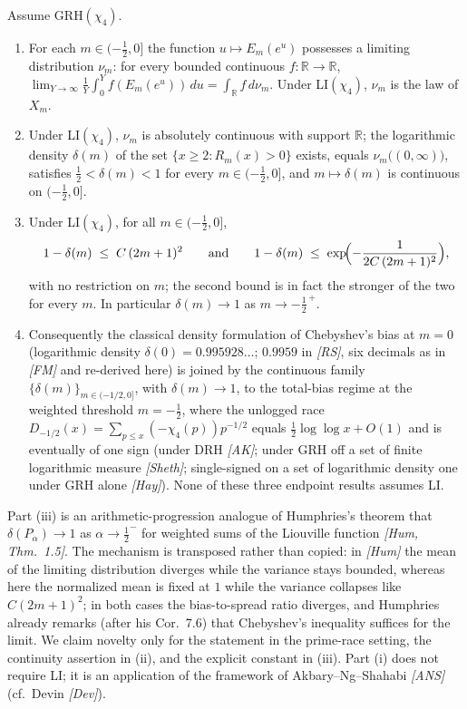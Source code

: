 \begin{theorem}\label{thm:interp}
Assume GRH$(\chi_4)$.
\begin{enumerate}
\item[(i)] For each $m\in(-\tfrac12,0]$ the function
$u\mapsto E_m(e^u)$ possesses a limiting distribution
$\nu_m$: for every bounded continuous $f:\mathbb R\to\mathbb R$,
$\lim_{Y\to\infty}\frac1Y\int_0^Y f(E_m(e^u))\,du
=\int_{\mathbb R}f\,d\nu_m$. Under LI$(\chi_4)$, $\nu_m$ is the law of
$X_m$.
\item[(ii)] Under LI$(\chi_4)$, $\nu_m$ is absolutely continuous with
support $\mathbb R$; the logarithmic density
$\delta(m)$ of the set $\{x\ge2: R_m(x)>0\}$ exists, equals
$\nu_m\bigl((0,\infty)\bigr)$, satisfies
$\tfrac12<\delta(m)<1$ for every $m\in(-\tfrac12,0]$, and
$m\mapsto\delta(m)$ is continuous on $(-\tfrac12,0]$.
\item[(iii)] Under LI$(\chi_4)$, for all $m\in(-\tfrac12,0]$,
\[
1-\delta(m)\;\le\;C\,(2m+1)^2
\qquad\text{and}\qquad
1-\delta(m)\;\le\;\exp\!\Bigl(-\frac{1}{2C\,(2m+1)^2}\Bigr),
\]
with no restriction on $m$; the second bound is in fact the stronger of
the two for every $m$. In particular $\delta(m)\to1$ as
$m\to-\tfrac12^{\,+}$.
\item[(iv)] Consequently the classical density formulation of
Chebyshev's bias at $m=0$ (logarithmic density
$\delta(0)=0.995928\ldots$; $0.9959$ in \emph{[RS]}, six decimals as in
\emph{[FM]} and re-derived here) is joined by the continuous family
$\{\delta(m)\}_{m\in(-1/2,0]}$, with $\delta(m)\to1$, to the
total-bias regime at the weighted threshold $m=-\tfrac12$, where the
unlogged race $D_{-1/2}(x)=\sum_{p\le x}(-\chi_4(p))p^{-1/2}$ equals
$\tfrac12\log\log x+O(1)$ and is eventually of one sign (under DRH
\emph{[AK]}; under GRH off a set of finite logarithmic measure
\emph{[Sheth]}; single-signed on a set of logarithmic density one under
GRH alone \emph{[Hay]}). None of these three endpoint results assumes
LI.
\end{enumerate}
\end{theorem}

\begin{remark}
Part (iii) is an arithmetic-progression analogue of Humphries's theorem
that $\delta(P_\alpha)\to1$ as $\alpha\to\tfrac12^-$ for weighted sums
of the Liouville function \emph{[Hum, Thm.~1.5]}. The mechanism is
transposed rather than copied: in \emph{[Hum]} the mean of the limiting
distribution diverges while the variance stays bounded, whereas here the
normalized mean is fixed at $1$ while the variance collapses like
$C(2m+1)^2$; in both cases the bias-to-spread ratio diverges, and
Humphries already remarks (after his Cor.~7.6) that Chebyshev's
inequality suffices for the limit. We claim novelty only for the
statement in the prime-race setting, the continuity assertion in (ii),
and the explicit constant in (iii). Part (i) does not require LI; it is
an application of the framework of Akbary--Ng--Shahabi \emph{[ANS]}
(cf.\ Devin \emph{[Dev]}).
\end{remark}

